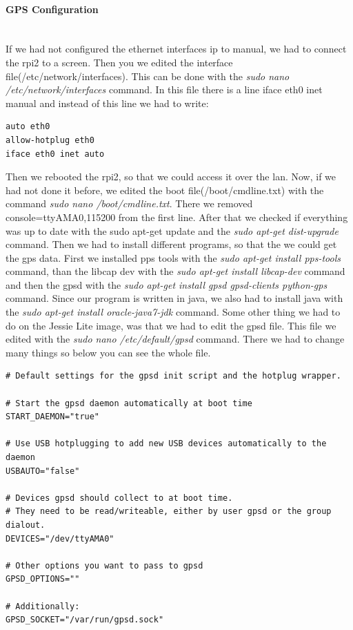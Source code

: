 \paragraph{GPS Configuration} \mbox{}\\
If we had not configured the ethernet interfaces \gls{ip} to manual, we had to connect the \gls{rpi2} to a screen. Then you we edited the interface file(/etc/network/interfaces). This can be done with the \textit{sudo nano /etc/network/interfaces} command. \newline
In this file there is a line iface eth0 inet manual and instead of this line we had to write:
\begin{verbatim}
auto eth0
allow-hotplug eth0
iface eth0 inet auto
\end{verbatim}
Then we rebooted the \gls{rpi2}, so that we could access it over the \gls{lan}. \newline
Now, if we had not done it before, we edited the boot file(/boot/cmdline.txt) with the command \textit{sudo nano /boot/cmdline.txt}. \newline
There we removed console=ttyAMA0,115200 from the first line.\newline
After that we checked if everything was up to date with the sudo apt-get update and the \textit{sudo apt-get dist-upgrade} command.\newline
Then we had to install different programs, so that the we could get the \gls{gps} data.\newline
First we installed pps tools with the \textit{sudo apt-get install pps-tools} command, than the libcap dev with the \textit{sudo apt-get install libcap-dev} command and then the \gls{gpsd} with the \textit{sudo apt-get install gpsd gpsd-clients python-gps} command.\newline
Since our program is written in java, we also had to install java with the \textit{sudo apt-get install oracle-java7-jdk} command.\newline
Some other thing we had to do on the Jessie Lite image, was that we had to edit the \gls{gpsd} file. This file we edited with the \textit{sudo nano /etc/default/gpsd} command.\newline
There we had to change many things so below you can see the whole file. 
\begin{verbatim}
# Default settings for the gpsd init script and the hotplug wrapper.

# Start the gpsd daemon automatically at boot time
START_DAEMON="true"

# Use USB hotplugging to add new USB devices automatically to the daemon
USBAUTO="false"

# Devices gpsd should collect to at boot time.
# They need to be read/writeable, either by user gpsd or the group dialout.
DEVICES="/dev/ttyAMA0"

# Other options you want to pass to gpsd
GPSD_OPTIONS=""

# Additionally:
GPSD_SOCKET="/var/run/gpsd.sock"
\end{verbatim}

